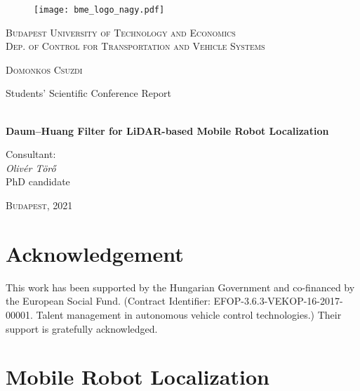 \documentclass[a4paper, 12pt]{paper}
\begin{document}
\begin{center}
	\begin{figure}[!h]
		\centering
		\texttt{[image: bme\_logo\_nagy.pdf]}
	\end{figure}
	\large\textsc{Budapest University of Technology and Economics\\
		Dep. of Control for Transportation
		and Vehicle Systems}
\end{center}
\thispagestyle{empty}
{\centering

	{\LARGE\textsc{Domonkos Csuzdi}

		\LARGE{Students' Scientific Conference Report}}

	{\Large\textbf{\\Daum--Huang Filter for LiDAR-based Mobile Robot Localization}}\\

	}

\begin{flushleft}
	\begin{minipage}{0.3\linewidth}
		\large{Consultant}:\\
		\forceindent \textit{Olivér Törő}\\
		\forceindent PhD candidate
	\end{minipage}
\end{flushleft}



\begin{center}
	{\Large\textsc{Budapest, }2021 }
\end{center}
\newpage
\thispagestyle{empty}
\newpage
\section*{Acknowledgement}
This work has been supported by the Hungarian Government and co-financed by the European Social Fund. (Contract Identifier: EFOP-3.6.3-VEKOP-16-2017-00001. Talent management in autonomous vehicle control technologies.) Their support is gratefully acknowledged.
\clearpage

\pagestyle{fancy}
\section{Mobile Robot Localization}
\thispagestyle{fancy}



\end{document}
